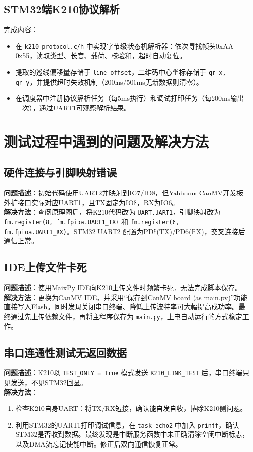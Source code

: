 \documentclass{article}
\begin{document}
\subsection{STM32端K210协议解析}
完成内容：
\begin{itemize}
    \item 在 \texttt{k210\_protocol.c/h} 中实现字节级状态机解析器：依次寻找帧头0xAA 0x55，读取类型、长度、载荷、校验和，超时自动复位。
    \item 提取的巡线偏移量存储于 \texttt{line\_offset}，二维码中心坐标存储于 \texttt{qr\_x, qr\_y}，并提供超时失效机制（200ms/500ms无新数据则清零）。
    \item 在调度器中注册协议解析任务（每5ms执行）和调试打印任务（每200ms输出一次），通过UART1可观察解析结果。
\end{itemize}

\section{测试过程中遇到的问题及解决方法}

\subsection{硬件连接与引脚映射错误}
\textbf{问题描述}：初始代码使用UART2并映射到IO7/IO8，但Yahboom CanMV开发板外扩接口实际对应UART1，且TX固定为IO8，RX为IO6。\\
\textbf{解决方法}：查阅原理图后，将K210代码改为 \texttt{UART.UART1}，引脚映射改为 \texttt{fm.register(8, fm.fpioa.UART1\_TX)} 和 \texttt{fm.register(6, fm.fpioa.UART1\_RX)}。STM32 UART2 配置为PD5(TX)/PD6(RX)，交叉连接后通信正常。

\subsection{IDE上传文件卡死}
\textbf{问题描述}：使用MaixPy IDE向K210上传文件时频繁卡死，无法完成脚本保存。\\
\textbf{解决方法}：更换为CanMV IDE，并采用“保存到CanMV board (as main.py)”功能直接写入Flash。同时发现关闭串口终端、降低上传波特率可大幅提高成功率。最终通过先上传依赖文件，再将主程序保存为 \texttt{main.py}，上电自动运行的方式稳定工作。

\subsection{串口连通性测试无返回数据}
\textbf{问题描述}：K210以 \texttt{TEST\_ONLY = True} 模式发送 \texttt{K210\_LINK\_TEST} 后，串口终端只见发送，不见STM32回显。\\
\textbf{解决方法}：
\begin{enumerate}
    \item 检查K210自身UART：将TX/RX短接，确认能自发自收，排除K210侧问题。
    \item 利用STM32的UART1打印调试信息，在 \texttt{task\_echo2} 中加入 \texttt{printf}，确认STM32是否收到数据。最终发现是中断服务函数中未正确清除空闲中断标志，以及DMA流忘记使能中断。修正后双向通信恢复正常。
\end{enumerate}
\end{document}
